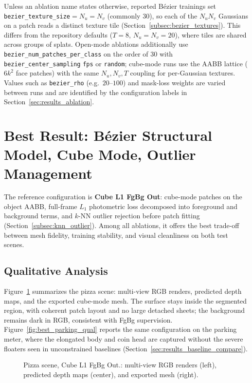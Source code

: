 Unless an ablation name states otherwise, reported B\'ezier trainings set \texttt{bezier\_texture\_size}$=N_u=N_v$ (commonly $30$), so each of the $N_u N_v$ Gaussians on a patch reads a distinct texture tile (Section~\ref{subsec:bezier_textures}). This differs from the repository defaults ($T{=}8$, $N_u{=}N_v{=}20$), where tiles are shared across groups of splats. Open-mode ablations additionally use \texttt{bezier\_num\_patches\_per\_class} on the order of $30$ with \texttt{bezier\_center\_sampling} \texttt{fps} or \texttt{random}; cube-mode runs use the AABB lattice ($6k^2$ face patches) with the same $N_u,N_v,T$ coupling for per-Gaussian textures. Values such as \texttt{bezier\_rho} (e.g.\ $20$--$100$) and mask-loss weights are varied between runs and are identified by the configuration labels in Section~\ref{sec:results_ablation}.

\section{Best Result: B\'ezier Structural Model, Cube Mode, Outlier Management}
\label{sec:results_best_cube_outliers}

The reference configuration is \textbf{Cube L1 FgBg Out}: cube-mode patches on the object AABB, full-frame $L_1$ photometric loss decomposed into foreground and background terms, and $k$-NN outlier rejection before patch fitting (Section~\ref{subsec:knn_outlier}). Among all ablations, it offers the best trade-off between mesh fidelity, training stability, and visual cleanliness on both test scenes.

\subsection{Qualitative Analysis}
\label{subsec:results_best_qual}

Figure~\ref{fig:best_pizza_qual} summarizes the pizza scene: multi-view RGB renders, predicted depth maps, and the exported cube-mode mesh. The surface stays inside the segmented region, with coherent patch layout and no large detached sheets; the background remains dark in RGB, consistent with FgBg supervision. Figure~\ref{fig:best_parking_qual} reports the same configuration on the parking meter, where the elongated body and coin head are captured without the severe floaters seen in unconstrained baselines (Section~\ref{sec:results_baseline_compare}).

\begin{figure}[H]
    \centering
    \caption{Pizza scene, Cube L1 FgBg Out.: multi-view RGB renders (left), predicted depth maps (center), and exported mesh (right).}
    \label{fig:best_pizza_qual}
\end{figure}

